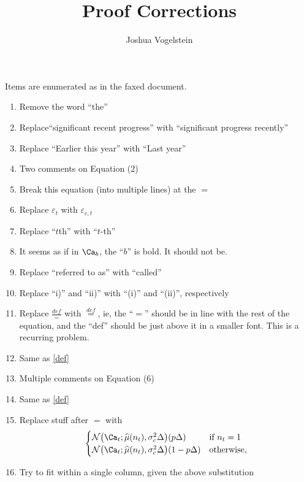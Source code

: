  
\title{Proof Corrections}
\author{Joshua Vogelstein}


\maketitle
Items are enumerated as in the faxed document.

\begin{enumerate}

\item Remove the word ``the''
\item Replace``significant recent progress'' with ``significant progress recently''
\item Replace ``Earlier this year'' with ``Last year''
\item Two comments on Equation (2)
\ita 
\item Break this equation (into multiple lines) at the $=$ 
\item Replace $\varepsilon_t$ with $\varepsilon_{c,t}$
\itb
\item Replace ``$t$th'' with ``$t$-th''
\item It seems as if in $\Ca_b$, the ``$b$'' is bold.  It should not be.
\item Replace ``referred to as'' with ``called''
\item Replace ``i)'' and ``ii)'' with ``(i)'' and ``(ii)'', respectively 
\item Replace $\frac{def}{=}$ with $\overset{def}{=}$, ie, the ``$=$'' should be in line with the rest of the equation, and the ``def'' should be just above it in a smaller font.  This is a recurring problem.  \label{def}
\item Same as \ref{def}
\item Multiple comments on Equation (6)
\ita
\item Same as \ref{def}
\item Replace stuff after $=$ with
\begin{align}
\begin{cases}
\mathcal{N}\big(\Ca_t; \widehat{\mu}(n_t), \sigma_c^2 \Delta\big) (p \Delta)& \text{if } n_t=1 \\
\mathcal{N}\big(\Ca_t; \widehat{\mu}(n_t), \sigma_c^2 \Delta\big) (1-p \Delta)& \text{otherwise,}\\
\end{cases}
\end{align}
\item Try to fit within a single column, given the above substitution

\end{enumerate}
